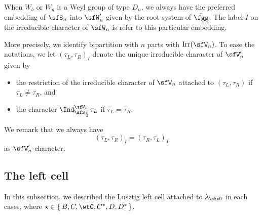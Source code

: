 \documentclass[12pt,a4paper]{amsart}
\numberwithin{equation}{section}
\theoremstyle{remark}
\def\Irr{\mathrm{Irr}}
\def\Wb{W_{b}}
\def\Wg{W_{g}}
\def\ckfgg{{\check \fgg}}
\begin{document}
  When $\Wb$ or $\Wg$ is a Weyl group of type $D_{n}$, we always have the
  preferred embedding of $\sfS_{n}$ into $\sfW'_{n}$ given by the root system of
  $\ckfgg$. The label $I$ on the irreducible character of $\sfW_{n}$ is refer to
  this particular embedding.

  More precisely, we identify bipartition with $n$ parts with $\Irr(\sfW_{n})$.
  To ease the notations, we let $(\tau_{L},\tau_{R})_{I}$ denote
  the unique irreducible character of $\sfW'_{n}$ given by
  \begin{itemize}
    \item the restriction of
    the irreducible character of $\sfW_{n}$ attached to $(\tau_{L},\tau_{R})$ if
    $\tau_{L}\neq \tau_{R}$, and
    \item
    the character
    $\Ind_{\sfS_{\frac{n}{2}}}^{\sfW_{n}} \tau_{L}$ if $\tau_{L}=\tau_{R}$.
  \end{itemize}
  We remark that we always have
  \[
    (\tau_{L},\tau_{R})_{I}=(\tau_{R},\tau_{L})_{I}
  \]
  as $\sfW'_{n}$-character.


  \subsection{The left cell}
  \label{sec:LCBCD}
  In this subsection, we described the Lusztig left cell attached to
  $\lambda_{\ckcO}$ in each cases, where
  $\star \in \set{B,C,\wtC,C^{*},D,D^{*}}$.
\end{document}

